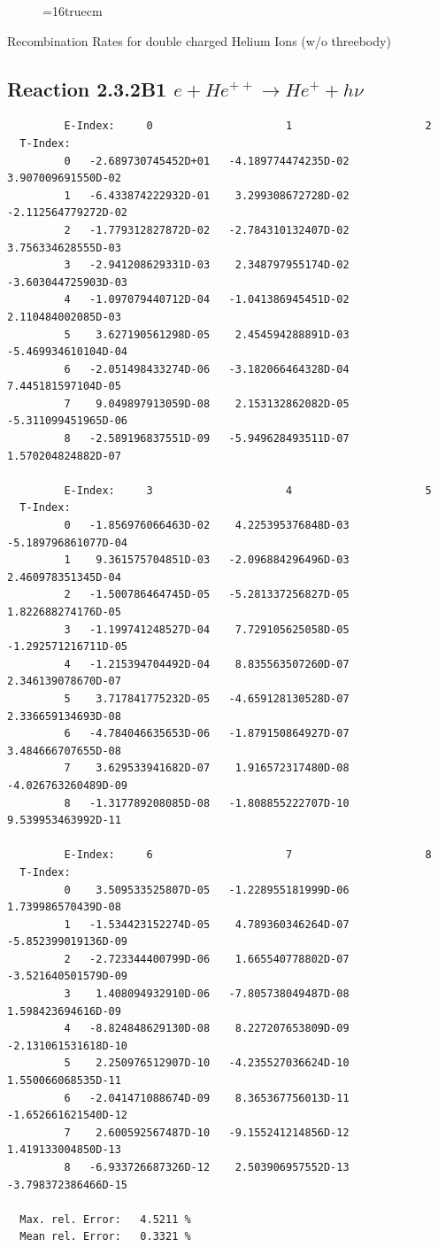 \documentclass[12pt,dvips]{article}
\begin{document}
\begin{figure} \label{2.3.2B0}
\epsfxsize=16truecm
\end{figure}
\newpage
  Recombination Rates for double charged Helium Ions (w/o threebody)

\subsection{
Reaction 2.3.2B1  $e + He^{++} \rightarrow He^+ + h\nu$
}


\begin{small}\begin{verbatim}
         E-Index:     0                     1                     2
  T-Index:
         0   -2.689730745452D+01   -4.189774474235D-02    3.907009691550D-02
         1   -6.433874222932D-01    3.299308672728D-02   -2.112564779272D-02
         2   -1.779312827872D-02   -2.784310132407D-02    3.756334628555D-03
         3   -2.941208629331D-03    2.348797955174D-02   -3.603044725903D-03
         4   -1.097079440712D-04   -1.041386945451D-02    2.110484002085D-03
         5    3.627190561298D-05    2.454594288891D-03   -5.469934610104D-04
         6   -2.051498433274D-06   -3.182066464328D-04    7.445181597104D-05
         7    9.049897913059D-08    2.153132862082D-05   -5.311099451965D-06
         8   -2.589196837551D-09   -5.949628493511D-07    1.570204824882D-07

         E-Index:     3                     4                     5
  T-Index:
         0   -1.856976066463D-02    4.225395376848D-03   -5.189796861077D-04
         1    9.361575704851D-03   -2.096884296496D-03    2.460978351345D-04
         2   -1.500786464745D-05   -5.281337256827D-05    1.822688274176D-05
         3   -1.199741248527D-04    7.729105625058D-05   -1.292571216711D-05
         4   -1.215394704492D-04    8.835563507260D-07    2.346139078670D-07
         5    3.717841775232D-05   -4.659128130528D-07    2.336659134693D-08
         6   -4.784046635653D-06   -1.879150864927D-07    3.484666707655D-08
         7    3.629533941682D-07    1.916572317480D-08   -4.026763260489D-09
         8   -1.317789208085D-08   -1.808855222707D-10    9.539953463992D-11

         E-Index:     6                     7                     8
  T-Index:
         0    3.509533525807D-05   -1.228955181999D-06    1.739986570439D-08
         1   -1.534423152274D-05    4.789360346264D-07   -5.852399019136D-09
         2   -2.723344400799D-06    1.665540778802D-07   -3.521640501579D-09
         3    1.408094932910D-06   -7.805738049487D-08    1.598423694616D-09
         4   -8.824848629130D-08    8.227207653809D-09   -2.131061531618D-10
         5    2.250976512907D-10   -4.235527036624D-10    1.550066068535D-11
         6   -2.041471088674D-09    8.365367756013D-11   -1.652661621540D-12
         7    2.600592567487D-10   -9.155241214856D-12    1.419133004850D-13
         8   -6.933726687326D-12    2.503906957552D-13   -3.798372386466D-15

  Max. rel. Error:   4.5211 %
  Mean rel. Error:   0.3321 %

\end{verbatim}\end{small}
\end{document}

